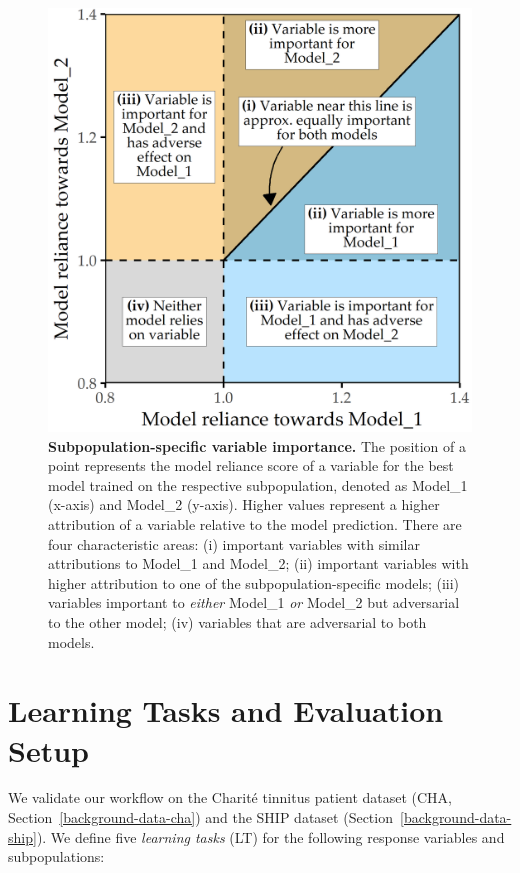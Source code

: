 \documentclass[
  oneside]{book}
\begin{document}
\begin{figure}[htb]

{\centering \includegraphics[width=0.5\linewidth]{figures/09-mr-legend} 

}

\caption{\textbf{Subpopulation-specific variable importance.} The position of a point represents the model reliance score of a variable for the best model trained on the respective subpopulation, denoted as Model\_1 (x-axis) and Model\_2 (y-axis). Higher values represent a higher attribution of a variable relative to the model prediction. There are four characteristic areas: (i) important variables with similar attributions to Model\_1 and Model\_2; (ii) important variables with higher attribution to one of the subpopulation-specific models; (iii) variables important to \emph{either} Model\_1 \emph{or} Model\_2 but adversarial to the other model; (iv) variables that are adversarial to both models.}\label{fig:09-mr-legend}
\end{figure}

\hypertarget{gender-learning-tasks}{%
\section{Learning Tasks and Evaluation Setup}\label{gender-learning-tasks}}

We validate our workflow on the Charité tinnitus patient dataset (CHA, Section~\ref{background-data-cha}) and the SHIP dataset (Section~\ref{background-data-ship}).
We define five \emph{learning tasks} (LT) for the following response variables and subpopulations:
\end{document}
